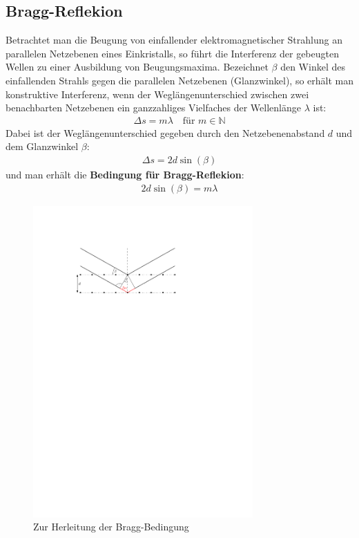 \documentclass[11pt, a4paper]{article}
\begin{document}
\subsection{Bragg-Reflekion}
Betrachtet man die Beugung von einfallender elektromagnetischer Strahlung an parallelen Netzebenen eines Einkristalls, so führt die Interferenz der gebeugten Wellen zu einer Ausbildung von Beugungsmaxima.
Bezeichnet $\beta$ den Winkel des einfallenden Strahls gegen die parallelen Netzebenen (Glanzwinkel), so erhält man konstruktive Interferenz, wenn der Weglängenunterschied zwischen zwei benachbarten Netzebenen ein ganzzahliges Vielfaches der Wellenlänge $\lambda$ ist:
\begin{align}
  \Delta s = m \lambda \quad \text{für } m \in \mathbb{N}
\end{align}
Dabei ist der Weglängenunterschied gegeben durch den Netzebenenabstand $d$ und dem Glanzwinkel $\beta$:
\begin{align}
  \Delta s = 2 d \sin(\beta)
\end{align}
und man erhält die \textbf{Bedingung für Bragg-Reflekion}:
\begin{align}
  2 d \sin(\beta) = m \lambda
  \label{eq:bragg}
\end{align}

\begin{figure}[h]
\centering
\includegraphics[width=0.75\textwidth]{./grafiken/bragg.pdf}
\caption{Zur Herleitung der Bragg-Bedingung}
\label{fig:bragg_bedingung}
\end{figure}
\end{document}
